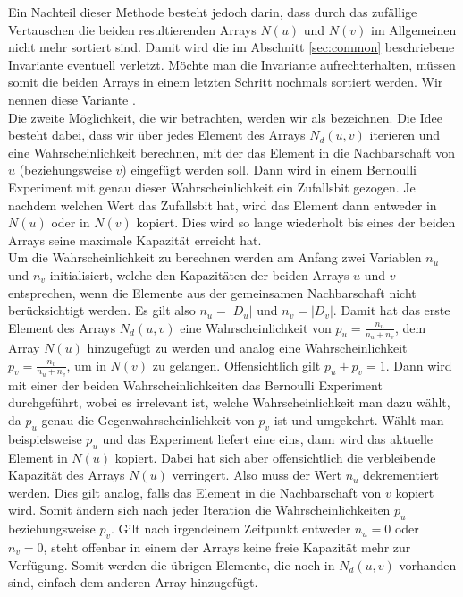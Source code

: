 Ein Nachteil dieser Methode besteht jedoch darin, dass durch das zufällige Vertauschen die beiden resultierenden Arrays
$N(u)$ und $N(v)$ im Allgemeinen nicht mehr sortiert sind. Damit wird die im Abschnitt \ref{sec:common} beschriebene
Invariante eventuell verletzt. Möchte man die Invariante aufrechterhalten, müssen somit die beiden Arrays
in einem letzten Schritt nochmals sortiert werden.
Wir nennen diese Variante \perm.
\\

Die zweite Möglichkeit, die wir betrachten, werden wir als \distr{} bezeichnen.
Die Idee besteht dabei, dass wir über jedes Element des Arrays $N_{d}(u,v)$ iterieren und eine Wahrscheinlichkeit
berechnen, mit
der das Element in die Nachbarschaft von $u$ (beziehungsweise $v$) eingefügt werden soll. Dann wird in einem 
Bernoulli Experiment mit genau dieser Wahrscheinlichkeit ein Zufallsbit gezogen. Je nachdem welchen
Wert das Zufallsbit hat, wird das Element dann entweder in $N(u)$ oder in $N(v)$ kopiert. Dies wird so lange
wiederholt bis eines der beiden Arrays seine maximale Kapazität erreicht hat. 
\\

Um die Wahrscheinlichkeit zu berechnen werden am Anfang zwei Variablen $n_u$ und $n_v$ initialisiert, 
welche den Kapazitäten der beiden Arrays $u$ und $v$ entsprechen, wenn die Elemente aus der 
gemeinsamen Nachbarschaft nicht berücksichtigt werden. Es gilt also $n_u = |D_{u}|$ und
$n_v= |D_{v}|$.
Damit hat das erste Element des Arrays $N_{d}(u,v)$ eine Wahrscheinlichkeit von $p_u = \frac{n_u}{n_u+n_v}$, dem
Array $N(u)$ hinzugefügt zu werden und analog eine Wahrscheinlichkeit $p_v = \frac{n_v}{n_u+n_v}$, um
in $N(v)$ zu gelangen. Offensichtlich gilt $p_u + p_v = 1$. Dann wird mit einer der beiden
Wahrscheinlichkeiten das Bernoulli Experiment durchgeführt, wobei es irrelevant ist, welche Wahrscheinlichkeit
man dazu wählt, da $p_u$ genau die Gegenwahrscheinlichkeit von $p_v$ ist und umgekehrt. 
Wählt man beispielsweise $p_u$ und das Experiment liefert eine eins, dann wird das aktuelle Element
in $N(u)$ kopiert. Dabei
hat sich aber offensichtlich die verbleibende Kapazität des Arrays $N(u)$ verringert. Also muss
der Wert $n_u$ dekrementiert werden. Dies gilt analog, falls das Element in die Nachbarschaft von $v$ kopiert wird.
Somit ändern sich nach jeder Iteration die Wahrscheinlichkeiten $p_u$ beziehungsweise $p_v$.
Gilt nach irgendeinem Zeitpunkt entweder $n_u = 0$ oder $n_v = 0$, steht offenbar in einem der Arrays 
keine freie Kapazität mehr zur Verfügung. Somit werden die übrigen Elemente, die noch in $N_{d}(u,v)$ vorhanden sind, 
einfach dem anderen Array hinzugefügt.
\\

